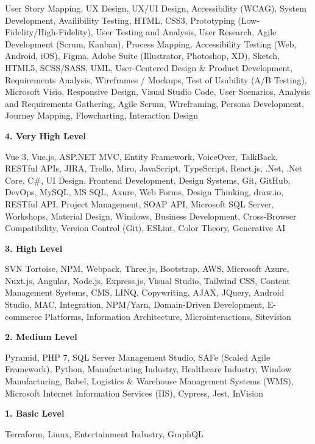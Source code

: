 \documentclass[a4paper,10pt]{article}
\begin{document}
User Story Mapping, UX Design, UX/UI Design, Accessibility (WCAG), System Development, Availibility Testing, HTML, CSS3, Prototyping (Low-Fidelity/High-Fidelity), User Testing and Analysis, User Research, Agile Development (Scrum, Kanban), Process Mapping, Accessibility Testing (Web, Android, iOS), Figma, Adobe Suite (Illustrator, Photoshop, XD), Sketch, HTML5, SCSS/SASS, UML, User-Centered Design \& Product Development, Requirements Analysis, Wireframes / Mockups, Test of Usability (A/B Testing), Microsoft Visio, Responsive Design, Visual Studio Code, User Scenarios, Analysis and Requirements Gathering, Agile Scrum, Wireframing, Persona Development, Journey Mapping, Flowcharting, Interaction Design
\vspace{0.3cm}

\textbf{4. Very High Level}

Vue 3, Vue.js, ASP.NET MVC, Entity Framework, VoiceOver, TalkBack, RESTful APIs, JIRA, Trello, Miro, JavaScript, TypeScript, React.js, .Net, .Net Core, C\#, UI Design, Frontend Development, Design Systems, Git, GitHub, DevOps, MySQL, MS SQL, Axure, Web Forms, Design Thinking, draw.io, RESTful API, Project Management, SOAP API, Microsoft SQL Server, Workshops, Material Design, Windows, Business Development, Cross-Browser Compatibility, Version Control (Git), ESLint, Color Theory, Generative AI
\vspace{0.5cm}

\textbf{3. High Level}

SVN Tortoise, NPM, Webpack, Three.js, Bootstrap, AWS, Microsoft Azure, Nuxt.js, Angular, Node.js, Express.js, Visual Studio, Tailwind CSS, Content Management Systems, CMS, LINQ, Copywriting, AJAX, JQuery, Android Studio, MAC, Integration, NPM/Yarn, Domain-Driven Development, E-commerce Platforms, Information Architecture, Microinteractions, Sitevision
\vspace{0.5cm}

\textbf{2. Medium Level}

Pyramid, PHP 7, SQL Server Management Studio, SAFe (Scaled Agile Framework), Python, Manufacturing Industry, Healthcare Industry, Window Manufacturing, Babel, Logistics \& Warehouse Management Systems (WMS), Microsoft Internet Information Services (IIS), Cypress, Jest, InVision
\vspace{0.5cm}

\textbf{1. Basic Level}

Terraform, Linux, Entertainment Industry, GraphQL
\end{document}
